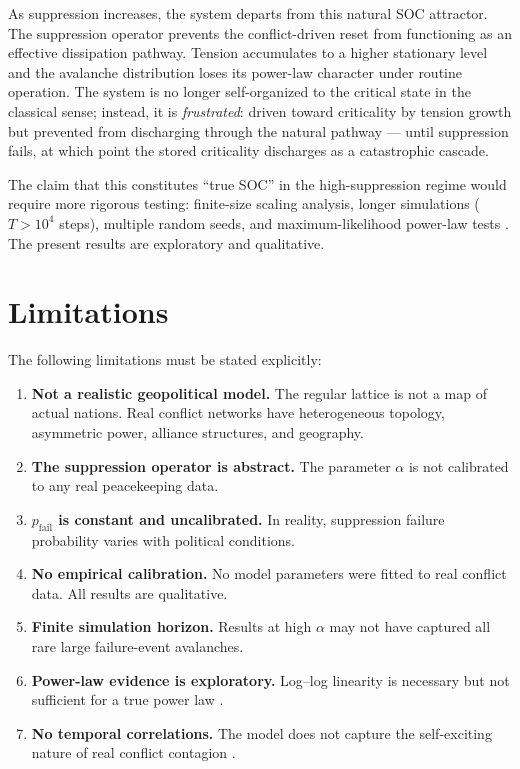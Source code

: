 \documentclass[12pt,a4paper]{article}
\begin{document}
As suppression increases, the system departs from this natural SOC attractor. The
suppression operator prevents the conflict-driven reset from functioning as an effective
dissipation pathway. Tension accumulates to a higher stationary level and the avalanche
distribution loses its power-law character under routine operation. The system is no
longer self-organized to the critical state in the classical sense; instead, it is
\emph{frustrated}: driven toward criticality by tension growth but prevented from
discharging through the natural pathway --- until suppression fails, at which point the
stored criticality discharges as a catastrophic cascade.

The claim that this constitutes ``true SOC'' in the high-suppression regime would
require more rigorous testing: finite-size scaling analysis, longer simulations
($T > 10^4$ steps), multiple random seeds, and maximum-likelihood power-law tests
\citep{clauset2009}. The present results are exploratory and qualitative.

\section{Limitations}

The following limitations must be stated explicitly:
\begin{enumerate}[leftmargin=1.8em]
  \item \textbf{Not a realistic geopolitical model.} The regular lattice is not a map
        of actual nations. Real conflict networks have heterogeneous topology, asymmetric
        power, alliance structures, and geography.
  \item \textbf{The suppression operator is abstract.} The parameter $\alpha$ is not
        calibrated to any real peacekeeping data.
  \item \textbf{$p_{\text{fail}}$ is constant and uncalibrated.} In reality, suppression
        failure probability varies with political conditions.
  \item \textbf{No empirical calibration.} No model parameters were fitted to real
        conflict data. All results are qualitative.
  \item \textbf{Finite simulation horizon.} Results at high $\alpha$ may not have
        captured all rare large failure-event avalanches.
  \item \textbf{Power-law evidence is exploratory.} Log--log linearity is necessary but
        not sufficient for a true power law \citep{clauset2009}.
  \item \textbf{No temporal correlations.} The model does not capture the self-exciting
        nature of real conflict contagion \citep{hawkes1971}.
\end{enumerate}
\end{document}

